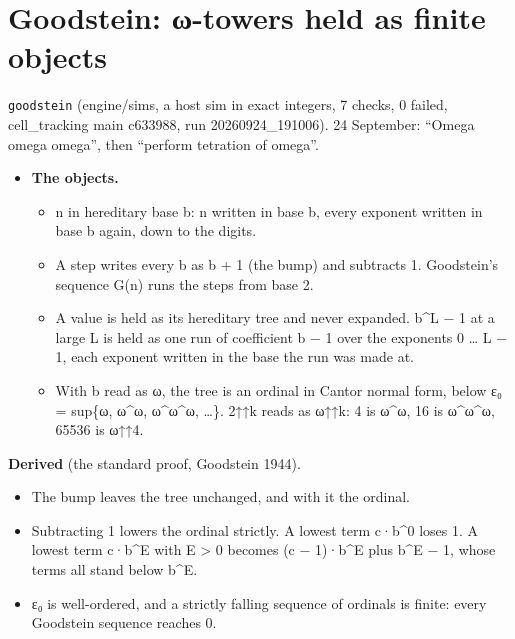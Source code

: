 \section{\texorpdfstring{Goodstein: ω-towers held as finite objects}{Goodstein: ω-towers held as finite objects}}

\texttt{goodstein} (engine/sims, a host sim in exact integers, 7 checks, 0 failed, cell\_\allowbreak{}tracking main c633988, run 20260924\_\allowbreak{}191006). 24 September: “Omega omega omega”, then “perform tetration of omega”.

\begin{itemize}
\item \textbf{The objects.}

\begin{itemize}
\item n in hereditary base b: n written in base b, every exponent written in base b again, down to the digits.
\item A step writes every b as b + 1 (the bump) and subtracts 1. Goodstein's sequence G(n) runs the steps from base 2.
\item A value is held as its hereditary tree and never expanded. b\textasciicircum{}L − 1 at a large L is held as one run of coefficient b − 1 over the exponents 0 … L − 1, each exponent written in the base the run was made at.
\item With b read as ω, the tree is an ordinal in Cantor normal form, below ε₀ = sup\{ω, ω\textasciicircum{}ω, ω\textasciicircum{}ω\textasciicircum{}ω, …\}. 2↑↑k reads as ω↑↑k: 4 is ω\textasciicircum{}ω, 16 is ω\textasciicircum{}ω\textasciicircum{}ω, 65536 is ω↑↑4.
\end{itemize}
\end{itemize}

\textbf{Derived} (the standard proof, Goodstein 1944).

\begin{itemize}
\item The bump leaves the tree unchanged, and with it the ordinal.
\item Subtracting 1 lowers the ordinal strictly. A lowest term c·b\textasciicircum{}0 loses 1. A lowest term c·b\textasciicircum{}E with E > 0 becomes (c − 1)·b\textasciicircum{}E plus b\textasciicircum{}E − 1, whose terms all stand below b\textasciicircum{}E.
\item ε₀ is well-ordered, and a strictly falling sequence of ordinals is finite: every Goodstein sequence reaches 0.
\end{itemize}

